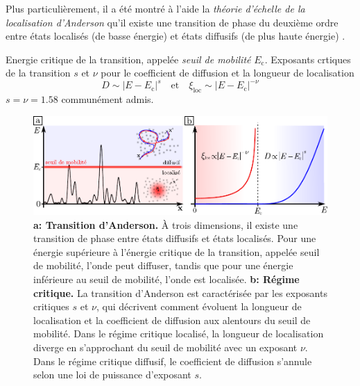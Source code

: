 Plus particulièrement, il a été montré à l'aide la \emph{théorie d'échelle de la localisation d'Anderson} qu'il existe une transition de phase du deuxième ordre entre états localisés (de basse énergie) et états diffusifs (de plus haute énergie) \citep{abrahams1979scaling}.



 








Energie critique de la transition, appelée \emph{seuil de mobilité} $E_{\mathrm{c}}$. Exposants crtiques de la transition $s$ et $\nu$ pour le coefficient de diffusion et la longueur de localisation 
\begin{equation}
D \sim \left| E-E_{\mathrm{c}} \right|^s \quad \text{et} \quad \xi_{\mathrm{loc}} \sim \left| E-E_{\mathrm{c}} \right|^{-\nu}
\end{equation}
$s=\nu=1.58$ communément admis.


\begin{figure}
\centering
\includegraphics[width=\textwidth]{Fig/Localisation/transition_anderson.pdf}
\caption{\textbf{a: Transition d'Anderson.} À trois dimensions, il existe une transition de phase entre états diffusifs et états localisés. Pour une énergie supérieure à l'énergie critique de la transition, appelée seuil de mobilité, l'onde peut diffuser, tandis que pour une énergie inférieure au seuil de mobilité, l'onde est localisée. \textbf{b: Régime critique.} La transition d'Anderson est caractérisée par les exposants critiques $s$ et $\nu$, qui décrivent comment évoluent la longueur de localisation et la coefficient de diffusion aux alentours du seuil de mobilité. Dans le régime critique localisé, la longueur de localisation diverge en s'approchant du seuil de mobilité avec un exposant $\nu$. Dans le régime critique diffusif, le coefficient de diffusion s'annule selon une loi de puissance d'exposant $s$. }
\label{fig:transition_anderson}
\end{figure}















